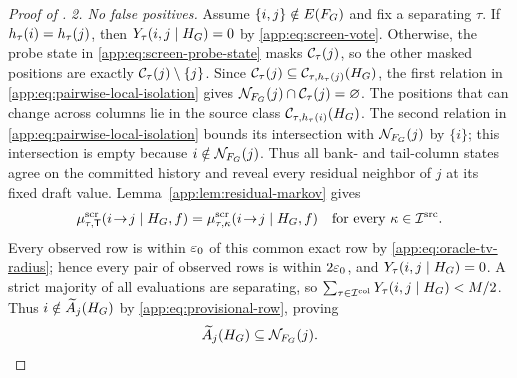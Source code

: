 \begin{proof}[Proof of \AppLowDegreeScreenRef]
\emph{2. No false positives.}
Assume $\{i,j\}\notin E(F_{G})$ and fix a separating $\tau$.
If $h_{\tau}(i)=h_{\tau}(j)$, then
$Y_{\tau}(i,j\mid H_{G})=0$ by \eqref{app:eq:screen-vote}.
Otherwise, the probe state in \eqref{app:eq:screen-probe-state} masks
$\mathcal C_{\tau}(j)$, so the other masked positions are exactly
$\mathcal C_{\tau}(j)\setminus\{j\}$.
Since $\mathcal C_{\tau}(j)
\subseteq\mathcal C_{\tau,h_{\tau}(j)}(H_{G})$, the first relation in
\eqref{app:eq:pairwise-local-isolation} gives
$\mathcal N_{F_{G}}(j)\cap\mathcal C_{\tau}(j)=\varnothing$.
The positions that can change across columns lie in the source class
$\mathcal C_{\tau,h_{\tau}(i)}(H_{G})$.
The second relation in \eqref{app:eq:pairwise-local-isolation} bounds its
intersection with $\mathcal N_{F_{G}}(j)$ by $\{i\}$;
this intersection is empty because $i\notin\mathcal N_{F_{G}}(j)$.
Thus all bank- and tail-column states agree on the committed history and
reveal every residual neighbor of $j$ at its fixed draft value.
Lemma~\ref{app:lem:residual-markov} gives
\begin{equation}
 \mu^{\mathrm{scr}}_{\tau,\mathsf T}(i\!\to\!j\mid H_{G},f)
 =\mu^{\mathrm{scr}}_{\tau,\kappa}(i\!\to\!j\mid H_{G},f)
 \quad\text{for every }\kappa\in\mathcal I^{\mathrm{src}}.
 \label{app:eq:nonedge-exact-row-equality}
\end{equation}
Every observed row is within $\varepsilon_0$ of this common exact row by
\eqref{app:eq:oracle-tv-radius}; hence every pair of observed rows is within
$2\varepsilon_0$, and $Y_{\tau}(i,j\mid H_{G})=0$.
A strict majority of all evaluations are separating, so
$\sum_{\tau\in\mathcal I^{\mathrm{col}}}Y_{\tau}(i,j\mid H_{G})<M/2$.
Thus $i\notin\widetilde A_{j}(H_{G})$ by \eqref{app:eq:provisional-row}, proving
\begin{equation}
 \widetilde A_{j}(H_{G})\subseteq\mathcal N_{F_{G}}(j).
 \label{app:eq:no-false-positive-row}
\end{equation}


\end{proof}
